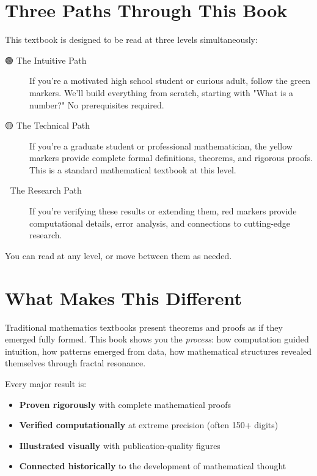 \section*{Three Paths Through This Book}

This textbook is designed to be read at three levels simultaneously:

\begin{description}
\item[🟢 The Intuitive Path] If you're a motivated high school student or curious adult, follow the green markers. We'll build everything from scratch, starting with "What is a number?" No prerequisites required.

\item[🟡 The Technical Path] If you're a graduate student or professional mathematician, the yellow markers provide complete formal definitions, theorems, and rigorous proofs. This is a standard mathematical textbook at this level.

\item[🔴 The Research Path] If you're verifying these results or extending them, red markers provide computational details, error analysis, and connections to cutting-edge research.
\end{description}

You can read at any level, or move between them as needed.

\section*{What Makes This Different}

Traditional mathematics textbooks present theorems and proofs as if they emerged fully formed. This book shows you the \textit{process}: how computation guided intuition, how patterns emerged from data, how mathematical structures revealed themselves through fractal resonance.

Every major result is:
\begin{itemize}
\item \textbf{Proven rigorously} with complete mathematical proofs
\item \textbf{Verified computationally} at extreme precision (often 150+ digits)
\item \textbf{Illustrated visually} with publication-quality figures
\item \textbf{Connected historically} to the development of mathematical thought
\end{itemize}

